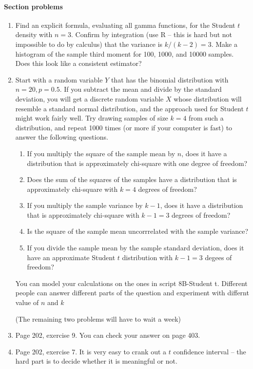 \documentclass[12pt]{article}
\begin{document}
\pagebreak

\paragraph*{Section problems}

\begin{enumerate}

\item Find an explicit formula, evaluating all gamma functions, for the Student $t$ density with $n = 3$.  Confirm by integration (use R -- this is hard but not impossible to do by calculus) that the variance is $k/(k-2) = 3$. Make a histogram of the sample third moment for 100, 1000, and 10000 samples. Does this look like a consistent estimator?

\item Start with a random variable $Y$ that has the binomial distribution with $n = 20, p = 0.5.$ If you subtract the mean and divide by the standard deviation, you will get a discrete random variable $X$ whose distribution will resemble a standard normal distribution, and the approach used for Student $t$ might work fairly well. Try drawing samples of size $k=4$ from such a distribution, and repeat 1000 times (or more if your computer is fast) to answer the following questions.

\begin{enumerate}
\item If you multiply the square of the sample mean by $n$, does it have a distribution that is approximately chi-square with one degree of freedom?
\item Does the sum of the squares of the samples have a distribution that is approximately chi-square with $k=4$ degrees of freedom?
\item If you multiply the sample variance by $k-1$, does it have a distribution that is approximately chi-square with $k-1=3$ degrees of freedom?
\item Is the square of the sample mean uncorrrelated with the sample variance?
\item If you divide the sample mean by the sample standard deviation, does it have an approximate Student $t$ distribution with $k-1=3$ degees of freedom?
\end{enumerate}

You can model your calculations on the ones in script 8B-Student t. Different people can answer different parts of the question and experiment with differnt value of $n$ and $k$

(The remaining two problems will have to wait a week)

\item Page 202, exercise 9. You can check your answer on page 403.

\item Page 202, exercise 7. It is very easy to crank out a $t$ confidence interval -- the hard part is to decide whether it is meaningful or not.


\end{enumerate}
\end{document}
